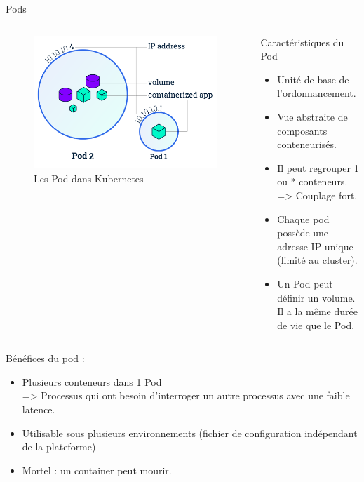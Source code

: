 \documentclass{bredelebeamer}
\begin{document}
\begin{frame}{Pods}

\begin{columns}
\begin{column}{0.5\textwidth}
\begin{figure}
\centering
\includegraphics[scale=0.25]{images/img7.png}
\caption{Les Pod dans Kubernetes}
\end{figure}
\end{column}
\begin{column}{0.5\textwidth}
\begin{block}{Caractéristiques du Pod}

\begin{itemize}
\item Unité de base de l'ordonnancement. 											\pause
\item Vue abstraite de composants conteneurisés.								\pause
\item Il peut regrouper 1 ou * conteneurs. \\=> Couplage fort.				\pause
\item Chaque pod possède une adresse IP unique (limité au cluster).		\pause
\item Un Pod peut définir un volume. 
		Il a la même durée de vie que le Pod.
\end{itemize}
\end{block}																							\pause
\end{column}



\end{columns}
\vspace{4px}
Bénéfices du pod : 
\begin{itemize}
\item Plusieurs conteneurs dans 1 Pod\\
=> Processus qui ont besoin d'interroger un autre processus avec une faible latence.		\pause
\item Utilisable sous plusieurs environnements (fichier de configuration indépendant de la plateforme)		\pause
\item Mortel : un container peut mourir.		
\end{itemize}
\end{frame}
\end{document}
